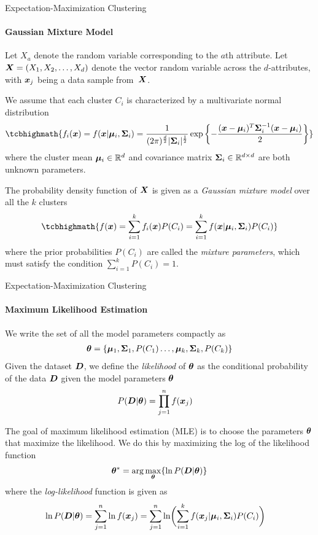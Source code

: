 \begin{frame}{Expectation-Maximization Clustering}
\framesubtitle{Gaussian Mixture Model}
\small
  Let $X_a$ denote the random variable corresponding to
the $a$th attribute. 
Let ${\boldsymbol X} = (X_1, X_2, \dots, X_d)$ denote the vector random
variable across the $d$-attributes, with ${\boldsymbol x}_{j}$ being a data
sample from~${\boldsymbol X}$.


\medskip
We assume that
each cluster $C_i$ is characterized by
a multivariate normal distribution
\begin{align*}
\tcbhighmath{
f_i(\bx) = f(\bx|\bmu_i,\cov_i)
= \frac{1}{(2\pi)^\frac{d}{2}|\cov_i|^\frac{1}{2}}
    \exp\lB\{-\frac{(\bx-\bmu_{i})^{T} \cov_i^{-1}
    (\bx-\bmu_{i})}{2}\rB\}
}
\end{align*}
where the cluster mean ${\bm \mu}_i \in {\mathord{\mathbb R}}^d$ and
covariance matrix
${\bm \Sigma}_i \in {\mathord{\mathbb R}}^{d \times d}$ are both unknown parameters.


\medskip
The probability density function of ${\boldsymbol X}$
is given as a
{\em Gaussian mixture model} over all the $k$ clusters
\begin{align*}
\tcbhighmath{
    f(\bx) = \sum_{i=1}^k f_i(\bx) P(C_i)
    = \sum_{i=1}^k f(\bx | \bmu_i, \cov_i) P(C_i)
}
\end{align*}
where the prior probabilities $P(C_i)$ are called the
{\em mixture parameters}, which must satisfy the condition
$\sum_{i=1}^k P(C_i) = 1$.


\end{frame}




\begin{frame}{Expectation-Maximization Clustering}
\framesubtitle{Maximum Likelihood Estimation}

  \small
We write the set of all the model parameters compactly as
\begin{align*}
    {\bm \theta} = \left\{{\bm \mu}_1,{\bm \Sigma}_1,P(C_1) \dots, {\bm \mu}_k, {\bm \Sigma}_k,
   P(C_k)\right\}
\end{align*}
Given the dataset ${\boldsymbol D}$, we def\/{i}ne the {\em likelihood} of
${\bm \theta}$ as the conditional probability of the data ${\boldsymbol D}$ given
the model parameters ${\bm \theta}$
\begin{align*}
P({\boldsymbol D} | {\bm \theta}) & = \prod_{j=1}^n f({\boldsymbol x}_{j})
\end{align*}

The goal of maximum likelihood estimation (MLE) is to choose the
parameters ${\bm \theta}$ that maximize the likelihood. We do this by
maximizing the log of the likelihood function
\begin{align*}
    {\bm \theta}^* = \arg\max_{{\bm \theta}} \{\ln P({\boldsymbol D} | {\bm \theta})\}
\end{align*}
where the {\em log-likelihood} function is given as
\begin{align*}
    \ln P({\boldsymbol D} | {\bm \theta}) & = \sum_{j=1}^n \ln f({\boldsymbol x}_{j})
    = \sum_{j=1}^n \ln \biggl( \sum_{i=1}^k f({\boldsymbol x}_{j} | {\bm \mu}_i,
{\bm \Sigma}_i)P(C_i)\biggr)
\end{align*}
\end{frame}


